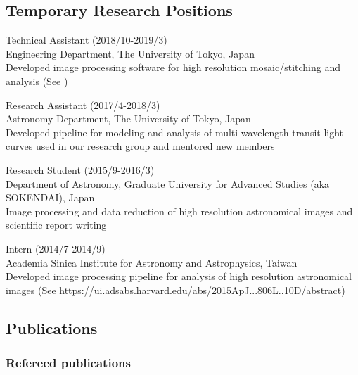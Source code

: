 \documentclass[12pt,letterpaper]{article}
\begin{document}
\subsection{Temporary Research Positions}
\begin{list}{}{\cvlist}
\item Technical Assistant (2018/10-2019/3)\\
      Engineering Department, The University of Tokyo, Japan\\
      Developed image processing software for high resolution mosaic/stitching and analysis (See \href{Murakami et al. 2018}{\spieurl})
\item Research Assistant (2017/4-2018/3)\\	
      Astronomy Department, The University of Tokyo, Japan\\
      Developed pipeline for modeling and analysis of multi-wavelength transit light curves used in our research group and mentored new members
\item Research Student (2015/9-2016/3)\\
      Department of Astronomy, Graduate University for Advanced Studies (aka SOKENDAI), Japan\\
      Image processing and data reduction of high resolution astronomical images and scientific report writing
\item Intern (2014/7-2014/9)\\
      Academia Sinica Institute for Astronomy and Astrophysics, Taiwan\\	
      Developed image processing pipeline for analysis of high resolution astronomical images (See \href{de Leon et al. 2015}{https://ui.adsabs.harvard.edu/abs/2015ApJ...806L..10D/abstract})
\end{list}

%   

\ifdefined\withpubs
  \subsection{Publications}
  

  \subsubsection{Refereed publications}
  \begin{list}{}{\cvlist}
    
  \end{list}
\end{document}
